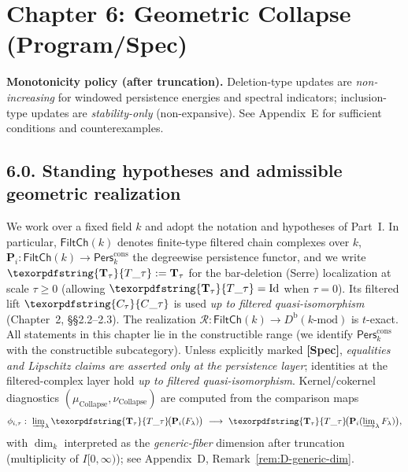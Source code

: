 \documentclass[11pt]{article}
\DeclareRobustCommand{\hyp}{\nobreakdash-}
\newcommand{\Pers}{\mathsf{Pers}}
\newcommand{\Rfun}{\mathcal{R}}
\numberwithin{equation}{section}
\theoremstyle{definition}
\DeclareRobustCommand{\FiltCh}[1]{\mathsf{FiltCh}(#1)}
\DeclareRobustCommand{\Perskft}{\Pers^{\mathrm{cons}}_{k}}
\DeclareRobustCommand{\Ttau}{\texorpdfstring{\ensuremath{\mathbf{T}_{\tau}}}{T\_\tau}}
\DeclareRobustCommand{\Ctau}{\texorpdfstring{\ensuremath{C_{\tau}}}{C\_\tau}}
\DeclareRobustCommand{\muc}{\mu_{\mathrm{Collapse}}}
\DeclareRobustCommand{\nuc}{\nu_{\mathrm{Collapse}}}
\begin{document}
\section{Chapter 6: Geometric Collapse (Program/Spec)}

\noindent\textbf{Monotonicity policy (after truncation).} Deletion\hyp type updates are \emph{non\hyp increasing} for windowed persistence energies and spectral indicators; inclusion\hyp type updates are \emph{stability\hyp only} (non\hyp expansive). See Appendix~E for sufficient conditions and counterexamples.

\subsection*{6.0. Standing hypotheses and admissible geometric realization}
We work over a fixed field \(k\) and adopt the notation and hypotheses of Part~I. In particular,
\(\FiltCh{k}\) denotes finite\hyp type filtered chain complexes over \(k\),
\(\mathbf{P}_i:\FiltCh{k}\to\Perskft\) the degreewise persistence functor,
and we write \(\Ttau:=\mathbf{T}_\tau\) for the bar\hyp deletion (Serre) localization at scale \(\tau\ge 0\) (allowing \(\Ttau=\mathrm{Id}\) when \(\tau=0\)).
Its filtered lift \(\Ctau\) is used \emph{up to filtered quasi\hyp isomorphism} (Chapter~2, §§2.2–2.3).
The realization \(\Rfun:\FiltCh{k}\to D^{\mathrm{b}}(k\text{-mod})\) is \(t\)\hyp exact.
All statements in this chapter lie in the constructible range (we identify \(\Perskft\) with the constructible subcategory).
Unless explicitly marked \textbf{[Spec]}, \emph{equalities and Lipschitz claims are asserted only at the persistence layer}; identities at the filtered\hyp complex layer hold \emph{up to filtered quasi\hyp isomorphism}.
Kernel/cokernel diagnostics \((\muc,\nuc)\) are computed from the comparison maps
\[
  \phi_{i,\tau}:\ \varinjlim\nolimits_\lambda \Ttau\!\big(\mathbf{P}_i(F_\lambda)\big)\ \longrightarrow\ \Ttau\!\big(\mathbf{P}_i(\varinjlim\nolimits_\lambda F_\lambda)\big),
\]
with \(\dim_k\) interpreted as the \emph{generic\hyp fiber} dimension after truncation (multiplicity of \(I[0,\infty)\)); see Appendix~D, Remark~\ref{rem:D-generic-dim}.
\end{document}
